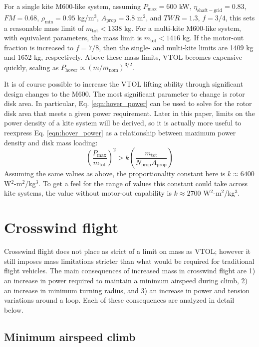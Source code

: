 \documentclass[11pt]{amsart}
\newcommand{\hover}{\mathrm{hover}}
\newcommand{\mx}{\mathrm{max}}
\newcommand{\mn}{\mathrm{min}}
\newcommand{\nominal}{\mathrm{nom}}
\newcommand{\prop}{\mathrm{prop}}
\newcommand{\shaftgrid}{\mathrm{shaft-grid}}
\newcommand{\total}{\mathrm{tot}}
\begin{document}
For a single kite M600-like system, assuming $P_{\mx} = 600$ kW,
$\eta_{\shaftgrid} = 0.83$, $\mathit{FM} = 0.68$, $\rho_{\mn} = 0.95$
kg/m$^3$, $A_{\prop} = 3.8$ m$^2$, and $\mathit{TWR} = 1.3$,
$f = 3/4$, this sets a reasonable mass limit of $m_{\total} < 1338$
kg.  For a multi-kite M600-like system, with equivalent parameters,
the mass limit is $m_{\total} < 1416$ kg.  If the motor-out fraction
is increased to $f = 7/8$, then the single- and multi-kite limits are
1409 kg and 1652 kg, respectively.  Above these mass limits, VTOL
becomes expensive quickly, scaling as
$P_{\hover} \propto (m/m_{\nominal})^{3/2}$.

It is of course possible to increase the VTOL lifting ability through
significant design changes to the M600.  The most significant
parameter to change is rotor disk area.  In particular,
Eq. \ref{eqn:hover_power} can be used to solve for the rotor disk area
that meets a given power requirement.  Later in this paper, limits on
the power density of a kite system will be derived, so it is actually
more useful to reexpress Eq. \ref{eqn:hover_power} as a relationship
between maximum power density and disk mass loading:
%
\begin{equation}
  \label{eqn:hover_power2}
  \left(\frac{P_{\mx}}{m_{\total}}\right)^2 >
  k \left(\frac{m_{\total}}{N_{\prop} A_{\prop}}\right)
\end{equation}
%
Assuming the same values as above, the proportionality constant here
is $k \approx 6400$ W$^2$-m$^2$/kg$^3$.  To get a feel for the range
of values this constant could take across kite systems, the value
without motor-out capability is $k \approx 2700$ W$^2$-m$^2$/kg$^3$.

\section{Crosswind flight}

Crosswind flight does not place as strict of a limit on mass as VTOL;
however it still imposes mass limitations stricter than what would be
required for traditional flight vehicles.  The main consequences of
increased mass in crosswind flight are 1) an increase in power
required to maintain a minimum airspeed during climb, 2) an increase
in minimum turning radius, and 3) an increase in power and tension
variations around a loop.  Each of these consequences are analyzed in
detail below.

\subsection{Minimum airspeed climb}
\end{document}
